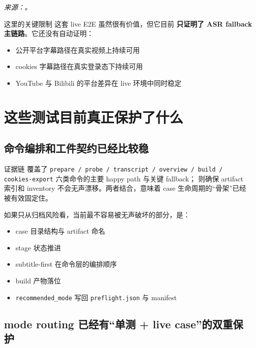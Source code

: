 \documentclass[a4paper]{article}
\begin{document}
\noindent\small\emph{来源：。}\normalsize

\begin{riskbox}{这里的关键限制}
这套 live E2E 虽然很有价值，但它目前 \textbf{只证明了 ASR fallback 主链路}。它还没有自动证明：
\begin{itemize}
\item 公开平台字幕路径在真实视频上持续可用
\item cookies 字幕路径在真实登录态下持续可用
\item YouTube 与 Bilibili 的平台差异在 live 环境中同时稳定
\end{itemize}
\end{riskbox}

\section{这些测试目前真正保护了什么}

\subsection{命令编排和工件契约已经比较稳}

\begin{evidencebox}{证据链}
 覆盖了 \texttt{prepare / probe / transcript / overview / build / cookies-export} 六类命令的主要 happy path 与关键 fallback； 则确保 artifact 索引和 inventory 不会无声漂移。两者结合，意味着 case 生命周期的“骨架”已经被有效固定住。
\end{evidencebox}

如果只从归档风险看，当前最不容易被无声破坏的部分，是：

\begin{itemize}
\item case 目录结构与 artifact 命名
\item stage 状态推进
\item subtitle-first 在命令层的编排顺序
\item build 产物落位
\item \texttt{recommended\_mode} 写回 \texttt{preflight.json} 与 manifest
\end{itemize}

\subsection{mode routing 已经有“单测 + live case”的双重保护}
\end{document}
